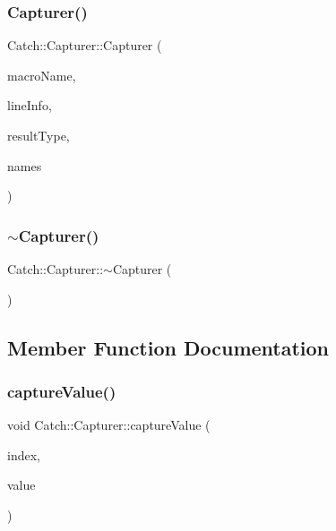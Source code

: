 \subsubsection{\texorpdfstring{Capturer()}{Capturer()}}
{\footnotesize\ttfamily Catch\+::\+Capturer\+::\+Capturer (\begin{DoxyParamCaption}\item[{\mbox{\hyperlink{class_catch_1_1_string_ref}{String\+Ref}}}]{macro\+Name,  }\item[{\mbox{\hyperlink{struct_catch_1_1_source_line_info}{Source\+Line\+Info}} const \&}]{line\+Info,  }\item[{\mbox{\hyperlink{struct_catch_1_1_result_was_a624e1ee3661fcf6094ceef1f654601ef}{Result\+Was\+::\+Of\+Type}}}]{result\+Type,  }\item[{\mbox{\hyperlink{class_catch_1_1_string_ref}{String\+Ref}}}]{names }\end{DoxyParamCaption})}

\mbox{\label{class_catch_1_1_capturer_aecde85cf69e65565cec91e325a657b82}} 
\subsubsection{\texorpdfstring{$\sim$\+Capturer()}{~Capturer()}}
{\footnotesize\ttfamily Catch\+::\+Capturer\+::$\sim$\+Capturer (\begin{DoxyParamCaption}{ }\end{DoxyParamCaption})}



\subsection{Member Function Documentation}
\mbox{\label{class_catch_1_1_capturer_a0695ebf77f7cdcb344c73bcb3d9131e4}} 
\subsubsection{\texorpdfstring{capture\+Value()}{captureValue()}}
{\footnotesize\ttfamily void Catch\+::\+Capturer\+::capture\+Value (\begin{DoxyParamCaption}\item[{size\+\_\+t}]{index,  }\item[{std\+::string const \&}]{value }\end{DoxyParamCaption})}

